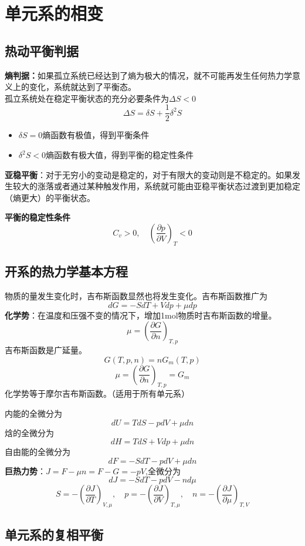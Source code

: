 \documentclass[12pt,a4paper]{article}
\begin{document}
\section{单元系的相变}

\subsection{热动平衡判据}

\textbf{熵判据：}如果孤立系统已经达到了熵为极大的情况，就不可能再发生任何热力学意义上的变化，系统就达到了平衡态。\\
孤立系统处在稳定平衡状态的充分必要条件为\(\Delta S<0\)
\[
\Delta S=\delta S+\frac{1}{2}\delta^2S
\]
\begin{itemize}
    \item \(\delta S=0\)熵函数有极值，得到平衡条件
    \item \(\delta^2S<0\)熵函数有极大值，得到平衡的稳定性条件
\end{itemize}
\textbf{亚稳平衡}：对于无穷小的变动是稳定的，对于有限大的变动则是不稳定的。如果发生较大的涨落或者通过某种触发作用，系统就可能由亚稳平衡状态过渡到更加稳定（熵更大）的平衡状态。

\textbf{平衡的稳定性条件}
\[
C_v>0,\quad\left(\frac{\partial p}{\partial V}\right)_T<0
\]

\subsection{开系的热力学基本方程}
物质的量发生变化时，吉布斯函数显然也将发生变化。吉布斯函数推广为
\[
dG=-SdT+Vdp+\mu dp
\]
\textbf{化学势}：在温度和压强不变的情况下，增加1mol物质时吉布斯函数的增量。
\[
\mu=\left(\frac{\partial G}{\partial n}\right)_{T,p}
\]
吉布斯函数是广延量。
\[
G(T,p,n)=nG_m(T,p)
\]
\[
\mu=\left(\frac{\partial G}{\partial n}\right)_{T,p}=G_m
\]
化学势等于摩尔吉布斯函数。（适用于所有单元系）

内能的全微分为
\[
dU=TdS-pdV+\mu dn
\]
焓的全微分为
\[
dH=TdS+Vdp+\mu dn
\]
自由能的全微分为
\[
dF=-SdT-pdV+\mu dn
\]
\textbf{巨热力势}：\(J=F-\mu n=F-G=-pV\),\quad 全微分为
\[
dJ=-SdT-pdV-nd\mu
\]
\[
S=-\left(\frac{\partial J}{\partial T}\right)_{V,\mu},\quad p=-\left(\frac{\partial J}{\partial V}\right)_{T,\mu},\quad n=-\left(\frac{\partial J}{\partial\mu}\right)_{T,V}
\]
\subsection{单元系的复相平衡}
\end{document}
